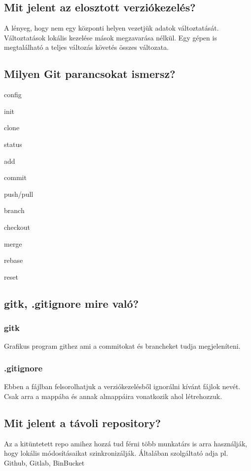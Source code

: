 \documentclass[a4paper,14pt]{extarticle}
\begin{document}
			\subsection{Mit jelent az elosztott verziókezelés?}
			A lényeg, hogy nem egy központi helyen vezetjük adatok változtatását. Változtatások lokális kezelése mások megzavarása nélkül. Egy gépen is megtalálható a teljes változás követés összes változata.
			\subsection{Milyen Git parancsokat ismersz?}
			\begin{compactitem}
				\item config
				\item init
				\item clone
				\item status
				\item add
				\item commit
				\item push/pull
				\item branch
				\item checkout
				\item merge
				\item rebase
				\item reset
			\end{compactitem}

		\subsection{gitk, .gitignore mire való?}
			\subsubsection{gitk}
			Grafikus program githez ami a commitokat és brancheket tudja megjeleníteni.
			\subsubsection{.gitignore}
			Ebben a fájlban felsorolhatjuk a verziókezelésből ignorálni kívánt fájlok nevét. Csak arra a mappába és annak almappáira vonatkozik ahol létrehozzuk.
		\subsection{Mit jelent a távoli repository?}
		Az a kitüntetett repo amihez hozzá tud férni több munkatárs is arra használják, hogy lokális módosításaikat szinkronizálják. Általában szolgáltató adja pl. Github, Gitlab, BinBucket
\end{document}
